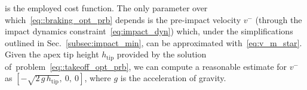 is the employed cost function.
The only parameter over which~\eqref{eq::braking_opt_prb} depends is the pre-impact velocity $v^{-}$ (through the impact dynamics constraint~\eqref{eq:impact_dyn}) which, under the simplifications outlined in Sec.~\ref{subsec:impact_min}, can be approximated with~\eqref{eq:v_m_star}. Given the apex tip height $h_{\mathrm{tip}}$ provided by the solution of~problem~\eqref{eq::takeoff_opt_prb}, we can compute a reasonable estimate for $v^{-}$ as $[-\sqrt{2\,g\,h_{\mathrm{tip}}},~0,~0]$, where $g$ is the acceleration of gravity.
